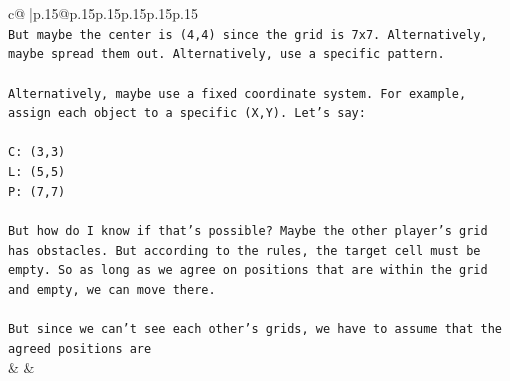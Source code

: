 \documentclass{article}
\begin{document}
{\begin{supertabular}{c@{$\;$}|p{.15\linewidth}@{}p{.15\linewidth}p{.15\linewidth}p{.15\linewidth}p{.15\linewidth}p{.15\linewidth}}
{{{\\ 
\texttt{But maybe the center is (4,4) since the grid is 7x7. Alternatively, maybe spread them out. Alternatively, use a specific pattern.} \\
\\ 
\texttt{Alternatively, maybe use a fixed coordinate system. For example, assign each object to a specific (X,Y). Let's say:} \\
\\ 
\texttt{C: (3,3)} \\
\texttt{L: (5,5)} \\
\texttt{P: (7,7)} \\
\\ 
\texttt{But how do I know if that's possible? Maybe the other player's grid has obstacles. But according to the rules, the target cell must be empty. So as long as we agree on positions that are within the grid and empty, we can move there.} \\
\\ 
\texttt{But since we can't see each other's grids, we have to assume that the agreed positions are} \\
            }
        }
    }
    & & \\ \\


\end{supertabular}}
\end{document}

